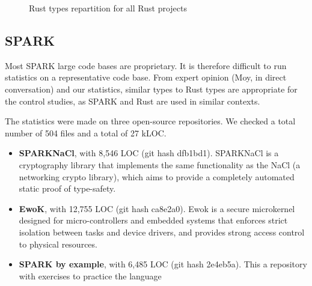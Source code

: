 \documentclass[nomenclature, english, bibtex]{kththesis}
\begin{document}
\begin{figure}[ht!]
  \centering
  \caption{Rust types repartition for all Rust projects}
  \label{fig:repartitionrust}
\end{figure}
\FloatBarrier

\subsection{SPARK}

Most SPARK large code bases are proprietary. It is therefore difficult to run statistics on a representative code base. From expert opinion (Moy, in direct conversation) and our statistics, similar types to Rust types are appropriate for the control studies, as SPARK and Rust are used in similar contexts.

The statistics were made on three open-source repositories. 
We checked a total number of 504 files and a total of 27 k\gls{LOC}.

\begin{itemize}
    \item \textbf{SPARKNaCl}, with 8,546 \gls{LOC} (git hash dfb1bd1). SPARKNaCl is a cryptography library that implements the same functionality as the NaCl (a networking crypto library), which aims to provide a completely automated static proof of type-safety.
    \item \textbf{EwoK}, with 12,755 LOC (git hash ca8e2a0). Ewok is a secure microkernel designed for micro-controllers and embedded systems that enforces strict isolation between tasks and device drivers, and provides strong access control to physical resources.  
    \item \textbf{SPARK by example}, with 6,485 LOC (git hash 2e4eb5a). This a repository with exercises to practice the language
\end{itemize}
\end{document}

